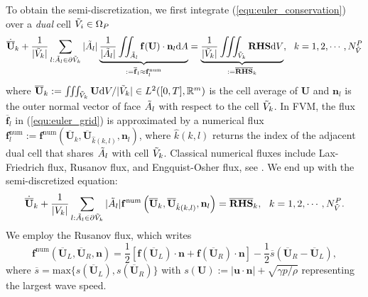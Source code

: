 \documentclass{article}
\begin{document}
To obtain the semi-discretization, we first integrate (\ref{equ:euler_conservation}) over a \emph{dual} cell $\Tilde{V}_i \in \Omega_P$
\begin{equation} \label{equ:euler_grid} 
    \dot{\overline{\mathbf{U}}}_k + \frac{1}{|\Tilde{V}_k|}\sum_{l:\Tilde{A}_l\in\partial \Tilde{V}_k} |\Tilde{A}_l|\underbrace{\frac{1}{|\Tilde{A}_l|}\iint_{\Tilde{A}_l}\mathbf{f}(\mathbf{U})\cdot \mathbf{n}_l \text{d}A}_{:= \overline{\mathbf{f}}_l \approx \mathbf{f}^\text{num}_l} = \underbrace{\frac{1}{|\Tilde{V}_k|}\iiint_{\Tilde{V}_k} \mathbf{RHS} \text{d}V}_{:= \overline{\mathbf{RHS}}_k},\ \ k = 1,2,\cdots,N_{\Tilde{V}}^P
\end{equation}
where $\overline{\mathbf{U}}_k := \iiint_{\Tilde{V}_k} \mathbf{U} \text{d}V / |\Tilde{V}_k| \in L^2([0,T],\mathbb{R}^m)$ is the cell average of $\mathbf{U}$ and $\mathbf{n}_l$ is the outer normal vector of face $\Tilde{A}_l$ with respect to the cell $\Tilde{V}_k$. In FVM, the flux $\overline{\mathbf{f}}_l$ in (\ref{equ:euler_grid}) is approximated by a numerical flux $\mathbf{f}^\text{num}_l := \mathbf{f}^\text{num}\left(\overline{\mathbf{U}}_k, \overline{\mathbf{U}}_{\hat{k}(k,l)}, \mathbf{n}_l\right)$, where $\hat{k}(k,l)$ returns the index of the adjacent dual cell that shares $\Tilde{A}_l$ with cell $\Tilde{V}_k$. Classical numerical fluxes include Lax-Friedrich flux, Rusanov flux, and Engquist-Osher flux, see \cite[][pp. 44-46]{mishra_2019}. We end up with the semi-discretized equation:
\begin{equation}
    \dot{\overline{\mathbf{U}}}_k + \frac{1}{|V_k|}\sum_{l:\Tilde{A}_l\in\partial \Tilde{V}_k} |\Tilde{A}_l| \mathbf{f}^\text{num}\left(\overline{\mathbf{U}}_k, \overline{\mathbf{U}}_{\hat{k}(k,l)}, \mathbf{n}_l\right) = \overline{\mathbf{RHS}}_k,\ \  k = 1,2,\cdots,N_{\Tilde{V}}^P.
    \label{equ:fvm}
\end{equation}
We employ the Rusanov flux, which writes
\begin{equation} \label{equ:rusanov-flux-3d}
    \mathbf{f}^\text{num}\left(\overline{\mathbf{U}}_L, \overline{\mathbf{U}}_R, \mathbf{n}\right) = \frac{1}{2}\left[\mathbf{f}(\overline{\mathbf{U}}_L)\cdot\mathbf{n} + \mathbf{f}(\overline{\mathbf{U}}_R)\cdot\mathbf{n}\right] - \frac{1}{2}\overline{s}\left(\overline{\mathbf{U}}_R - \overline{\mathbf{U}}_L\right),  
\end{equation}
where $\overline{s} = \text{max}\{s(\overline{\mathbf{U}}_L), s(\overline{\mathbf{U}}_R)\}$ with $s(\mathbf{U}) := |\mathbf{u}\cdot\mathbf{n}| + \sqrt{\gamma p/\rho}$ representing the largest wave speed. 
\end{document}
